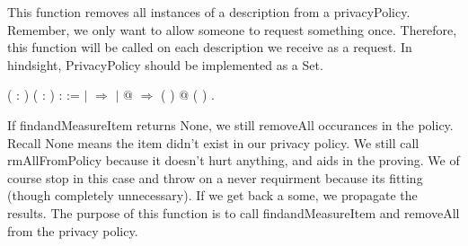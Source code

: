 \documentclass[12pt]{report}
\begin{document}
This function removes all instances of a description from a privacyPolicy.
Remember, we only want to allow someone to request something once. Therefore, this 
function will be called on each description we receive as a request. In hindsight,
PrivacyPolicy should be implemented as a Set.  
\begin{coqdoccode}
\coqdocnoindent
{}  ( : ) ( : ) :  :=\coqdoceol
\coqdocnoindent
{}  \coqdoceol
\coqdocindent{0.50em}
\ensuremath{|}  \ensuremath{\Rightarrow} \coqdoceol
\coqdocindent{0.50em}
\ensuremath{|} @    \ensuremath{\Rightarrow}  (  )    \coqdoceol
\coqdocindent{3.00em}
\coqdoceol
\coqdocindent{3.00em}
@   (  )\coqdoceol
\coqdocnoindent
{}.\coqdoceol
\coqdocemptyline
\end{coqdoccode}
If findandMeasureItem returns None, we still removeAll occurances in the policy.
Recall None means the item didn't exist in our privacy policy. We still call rmAllFromPolicy
because it doesn't hurt anything, and aids in the proving. We of course stop in this case
and throw on a never requirment because its fitting (though completely unnecessary).
If we get back a some, we propagate the results. 
The purpose of this function is to call findandMeasureItem and removeAll from the 
privacy policy.
\end{document}

